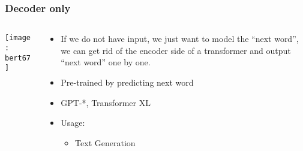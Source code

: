 \begin{frame}[fragile]\frametitle{Decoder only}

\begin{columns}
    \begin{column}[T]{0.5\linewidth}
			\begin{center}
			\texttt{[image: bert67]}
			\end{center}		
		\end{column}
    \begin{column}[T]{0.5\linewidth}
      \begin{itemize}
			\item If we do not have input, we just want to model the “next word”, we can get rid of the encoder side of a transformer and output “next word” one by one. 
			\item Pre-trained by predicting next word
			\item GPT-*, Transformer XL
			\item Usage:
      \begin{itemize}
			\item Text Generation
			\end{itemize}
			\end{itemize}
    \end{column}
  \end{columns}
			
\end{frame}

